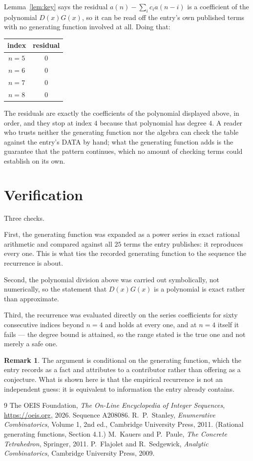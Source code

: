 \documentclass[11pt,a4paper]{article}
\theoremstyle{plain}
\theoremstyle{definition}
\newtheorem{remark}[theorem]{Remark}
\begin{document}
Lemma~\ref{lem:key} says the residual $a(n)-\sum_ic_ia(n-i)$ is a coefficient of the
polynomial $D(x)G(x)$, so it can be read off the entry's own published terms with no
generating function involved at all. Doing that:
\begin{center}
\begin{tabular}{cc}
index & residual \\ \hline
$n=5$ & $0$ \\
$n=6$ & $0$ \\
$n=7$ & $0$ \\
$n=8$ & $0$
\end{tabular}
\end{center}
The residuals are exactly the coefficients of the polynomial displayed above, in order, and
they stop at index $4$ because that polynomial has degree $4$. A reader who trusts
neither the generating function nor the algebra can check the table against the entry's DATA
by hand; what the generating function adds is the guarantee that the pattern continues, which
no amount of checking terms could establish on its own.

\section{Verification}

Three checks.

First, the generating function was expanded as a power series in exact rational arithmetic and
compared against all $25$ terms the entry publishes: it reproduces every one. This is
what ties the recorded generating function to the sequence the recurrence is about.

Second, the polynomial division above was carried out symbolically, not numerically, so the
statement that $D(x)G(x)$ is a polynomial is exact rather than approximate.

Third, the recurrence was evaluated directly on the series coefficients for sixty consecutive
indices beyond $n=4$ and holds at every one, and at $n=4$ itself it fails --- the
degree bound is attained, so the range stated is the true one and not merely a safe one.

\begin{remark}
The argument is conditional on the generating function, which the entry records as a fact and
attributes to a contributor rather than offering as a conjecture. What is shown here is that
the empirical recurrence is not an independent guess: it is equivalent to information the
entry already contains.
\end{remark}

\begin{thebibliography}{9}
 The OEIS Foundation, \emph{The On-Line Encyclopedia of Integer
Sequences}, \url{https://oeis.org}, 2026. Sequence A208086.
 R.~P.~Stanley, \emph{Enumerative Combinatorics}, Volume 1, 2nd ed.,
Cambridge University Press, 2011. (Rational generating functions, Section 4.1.)
 M.~Kauers and P.~Paule, \emph{The Concrete Tetrahedron}, Springer, 2011.
 P.~Flajolet and R.~Sedgewick, \emph{Analytic Combinatorics}, Cambridge
University Press, 2009.
\end{thebibliography}
\end{document}
